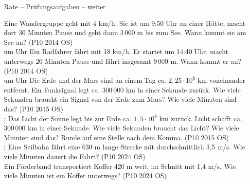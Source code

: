 \begin{aufgabe}{Rate – Prüfungsaufgaben – weiter}
\begin{teile}
\steil Eine Wandergruppe geht mit 4 km/h. Sie ist um 9:50 Uhr an einer Hütte, macht dort 30 Minuten Pause und geht dann 3\,000 m bis zum See. Wann kommt sie am See an? \hfill (P10 2014 OS) \\ um \leerfeld Uhr
\steil Ein Radfahrer fährt mit 18 km/h. Er startet um 14:40 Uhr, macht unterwegs 20 Minuten Pause und fährt insgesamt 9\,000 m. Wann kommt er an? \hfill (P10 2014 OS) \\ um \leerfeld Uhr
\steil Die Erde und der Mars sind an einem Tag ca. $2{,}25 \cdot 10^{8}$ km voneinander entfernt. Ein Funksignal legt ca. 300\,000 km in einer Sekunde zurück. Wie viele Sekunden braucht ein Signal von der Erde zum Mars? Wie viele Minuten sind das? \hfill (P10 2015 OS) \\ \leerfeld[s] ; \leerfeld[min]
\steil Das Licht der Sonne legt bis zur Erde ca. $1{,}5 \cdot 10^{8}$ km zurück. Licht schafft ca. 300\,000 km in einer Sekunde. Wie viele Sekunden braucht das Licht? Wie viele Minuten sind das? Runde auf eine Stelle nach dem Komma. \hfill (P10 2015 OS) \\ \leerfeld[s] ; \leerfeld[min]
\teil Eine Seilbahn fährt eine 630 m lange Strecke mit durchschnittlich 3,5 m/s. Wie viele Minuten dauert die Fahrt? \hfill (P10 2024 OS) \\ \leerfeld[min]
\teil Ein Förderband transportiert Koffer 420 m weit, im Schnitt mit 1,4 m/s. Wie viele Minuten ist ein Koffer unterwegs? \hfill (P10 2024 OS) \\ \leerfeld[min]
\end{teile}
\end{aufgabe}
